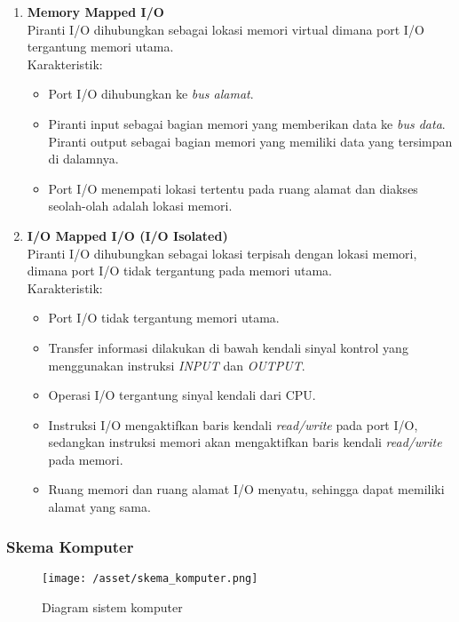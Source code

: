 \documentclass[12pt]{article}
\begin{document}
\begin{enumerate}
    \item \textbf{Memory Mapped I/O} \\
    Piranti I/O dihubungkan sebagai lokasi memori virtual dimana port I/O tergantung memori utama. \\ 
    Karakteristik:
    \begin{itemize}
        \item Port I/O dihubungkan ke \textit{bus alamat}.
        \item Piranti input sebagai bagian memori yang memberikan data ke \textit{bus data}. Piranti output sebagai bagian memori yang memiliki data yang tersimpan di dalamnya.
        \item Port I/O menempati lokasi tertentu pada ruang alamat dan diakses seolah-olah adalah lokasi memori.
    \end{itemize}
    
    \item \textbf{I/O Mapped I/O (I/O Isolated)} \\
    Piranti I/O dihubungkan sebagai lokasi terpisah dengan lokasi memori, dimana port I/O tidak tergantung pada memori utama. \\
    Karakteristik:
    \begin{itemize}
        \item Port I/O tidak tergantung memori utama.
        \item Transfer informasi dilakukan di bawah kendali sinyal kontrol yang menggunakan instruksi \textit{INPUT} dan \textit{OUTPUT}.
        \item Operasi I/O tergantung sinyal kendali dari CPU.
        \item Instruksi I/O mengaktifkan baris kendali \textit{read/write} pada port I/O, sedangkan instruksi memori akan mengaktifkan baris kendali \textit{read/write} pada memori.
        \item Ruang memori dan ruang alamat I/O menyatu, sehingga dapat memiliki alamat yang sama.
    \end{itemize}
\end{enumerate}

\subsubsection{Skema Komputer}

\begin{figure}[h]
    \centering
    \texttt{[image: /asset/skema\_komputer.png]}
    \caption{Diagram sistem komputer}
\end{figure}
\end{document}
